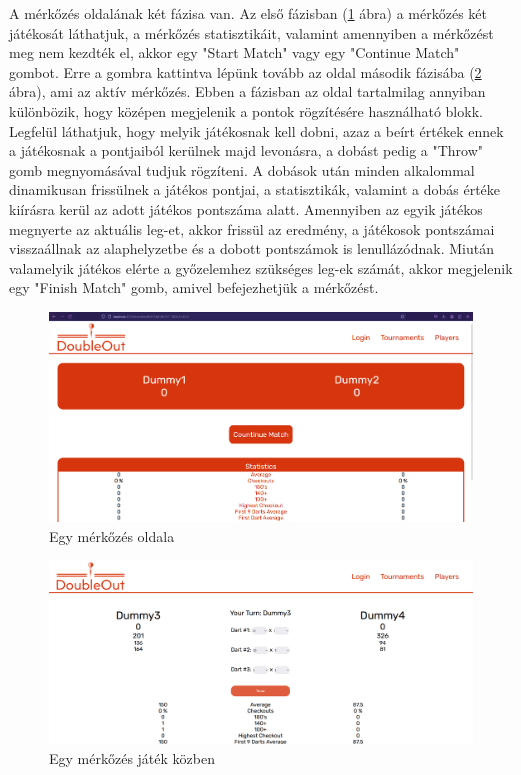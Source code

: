 A mérkőzés oldalának két fázisa van. Az első fázisban (\ref{fig:matchTest1} ábra) a mérkőzés két játékosát láthatjuk, a mérkőzés statisztikáit, valamint amennyiben a mérkőzést meg nem kezdték el, akkor egy "Start Match" vagy egy "Continue Match" gombot. Erre a gombra kattintva lépünk tovább az oldal második fázisába (\ref{fig:matchTest2} ábra), ami az aktív mérkőzés. Ebben a fázisban az oldal tartalmilag annyiban különbözik, hogy középen megjelenik a pontok rögzítésére használható blokk. Legfelül láthatjuk, hogy melyik játékosnak kell dobni, azaz a beírt értékek ennek a játékosnak a pontjaiból kerülnek majd levonásra, a dobást pedig a "Throw" gomb megnyomásával tudjuk rögzíteni. A dobások után minden alkalommal dinamikusan frissülnek a játékos pontjai, a statisztikák, valamint a dobás értéke kiírásra kerül az adott játékos pontszáma alatt. Amennyiben az egyik játékos megnyerte az aktuális leg-et, akkor frissül az eredmény, a játékosok pontszámai visszaállnak az alaphelyzetbe és a dobott pontszámok is lenullázódnak. Miután valamelyik játékos elérte a győzelemhez szükséges leg-ek számát, akkor megjelenik egy "Finish Match" gomb, amivel befejezhetjük a mérkőzést.

\begin{figure}[h]
\centering
\includegraphics[scale=0.3]{images/MatchTest1.png}
\caption{Egy mérkőzés oldala}
\label{fig:matchTest1}
\end{figure}

\begin{figure}[h]
\centering
\includegraphics[scale=0.3]{images/MatchTest2.png}
\caption{Egy mérkőzés játék közben}
\label{fig:matchTest2}
\end{figure}

